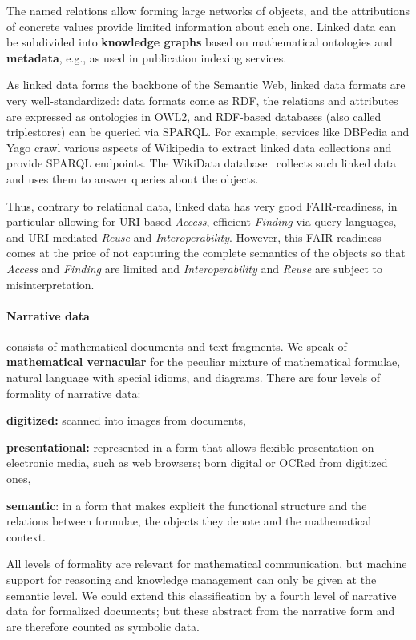 The named relations allow forming large networks of objects, and the attributions of concrete values provide limited information about each one.
Linked data can be subdivided into \textbf{knowledge graphs} based on mathematical ontologies and \textbf{metadata}, e.g., as used in publication indexing services.

As linked data forms the backbone of the Semantic Web, linked data formats are very well-standardized: data formats come as RDF, the relations and attributes are expressed as ontologies in OWL2, and RDF-based databases (also called triplestores) can be queried via SPARQL.
For example, services like DBPedia and Yago crawl various aspects of Wikipedia to extract linked data collections and provide SPARQL endpoints.
The WikiData database~\cite{wikidata:on} collects such linked data and uses them to answer queries about the objects.

Thus, contrary to relational data, linked data has very good FAIR-readiness, in particular allowing for URI-based \emph{Access}, efficient \emph{Finding} via query languages, and URI-mediated \emph{Reuse} and \emph{Interoperability}.
However, this FAIR-readiness comes at the price of not capturing the complete semantics of the objects so that \emph{Access} and \emph{Finding} are limited and \emph{Interoperability} and \emph{Reuse} are subject to misinterpretation.


\paragraph{Narrative data} consists of mathematical documents and text fragments. We speak of \textbf{mathematical vernacular} for the peculiar mixture of mathematical formulae, natural language with special idioms, and diagrams. There are four levels of formality of narrative data:
\begin{compactenum}
\item \textbf{digitized:} scanned into images from documents,
\item \textbf{presentational:} represented in a form that allows flexible
  presentation on electronic media, such as web browsers;
  born digital or OCRed from digitized ones,
\item \textbf{semantic}: in a form that makes explicit the functional structure and the
  relations between formulae, the objects they denote and the mathematical context.
\end{compactenum}
All levels of formality are relevant for mathematical communication, but machine support for reasoning and knowledge management can only be given at the semantic level.
We could extend this classification by a fourth level of narrative data for formalized documents; but these abstract from the narrative form and are therefore counted as symbolic data.

